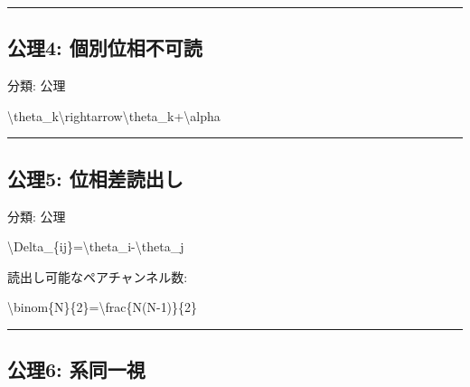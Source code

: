 \documentclass[
  a4paper]{ltjsarticle}
\newenvironment{Shaded}{}{}
\newcommand{\NormalTok}[1]{#1}
\begin{document}
\begin{center}\rule{0.5\linewidth}{0.5pt}\end{center}

\subsection{公理4:
個別位相不可読}\label{ux516cux74064-ux500bux5225ux4f4dux76f8ux4e0dux53efux8aad}

分類: 公理

\begin{Shaded}
\begin{Highlighting}[]
\NormalTok{\textbackslash{}theta\_k\textbackslash{}rightarrow\textbackslash{}theta\_k+\textbackslash{}alpha}
\end{Highlighting}
\end{Shaded}

\begin{center}\rule{0.5\linewidth}{0.5pt}\end{center}

\subsection{公理5:
位相差読出し}\label{ux516cux74065-ux4f4dux76f8ux5deeux8aadux51faux3057}

分類: 公理

\begin{Shaded}
\begin{Highlighting}[]
\NormalTok{\textbackslash{}Delta\_\{ij\}=\textbackslash{}theta\_i{-}\textbackslash{}theta\_j}
\end{Highlighting}
\end{Shaded}

読出し可能なペアチャンネル数:

\begin{Shaded}
\begin{Highlighting}[]
\NormalTok{\textbackslash{}binom\{N\}\{2\}=\textbackslash{}frac\{N(N{-}1)\}\{2\}}
\end{Highlighting}
\end{Shaded}

\begin{center}\rule{0.5\linewidth}{0.5pt}\end{center}

\subsection{公理6:
系同一視}\label{ux516cux74066-ux7cfbux540cux4e00ux8996}
\end{document}
